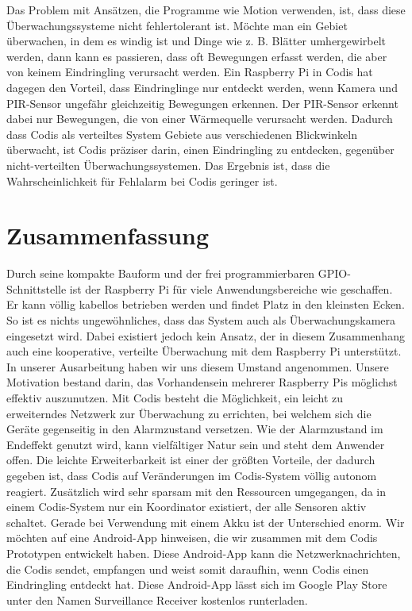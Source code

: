 \documentclass[journal]{IEEEtran}
\begin{document}
Das Problem mit Ansätzen, die Programme wie Motion verwenden, ist, dass diese Überwachungssysteme nicht fehlertolerant ist. Möchte man ein Gebiet überwachen, in dem es windig ist und Dinge wie z. B. Blätter umhergewirbelt werden, dann kann es passieren, dass oft Bewegungen erfasst werden, die aber von keinem Eindringling verursacht werden. Ein Raspberry Pi in Codis hat dagegen den Vorteil, dass Eindringlinge nur entdeckt werden, wenn Kamera und PIR-Sensor ungefähr gleichzeitig Bewegungen erkennen. Der PIR-Sensor erkennt dabei nur Bewegungen, die von einer Wärmequelle verursacht werden.\cite{raspi} Dadurch dass Codis als verteiltes System Gebiete aus verschiedenen Blickwinkeln überwacht, ist Codis präziser darin, einen Eindringling zu entdecken, gegenüber nicht-verteilten Überwachungssystemen. Das Ergebnis ist, dass die Wahrscheinlichkeit für Fehlalarm bei Codis geringer ist.

\section{Zusammenfassung}
Durch seine kompakte Bauform und der frei programmierbaren GPIO-Schnittstelle ist der Raspberry Pi für viele Anwendungsbereiche wie geschaffen. Er kann völlig kabellos betrieben werden und findet Platz in den kleinsten Ecken. So ist es nichts ungewöhnliches, dass das System auch als Überwachungskamera eingesetzt wird. Dabei existiert jedoch kein Ansatz, der in diesem Zusammenhang auch eine kooperative, verteilte Überwachung mit dem Raspberry Pi unterstützt. \\In unserer Ausarbeitung haben wir uns diesem Umstand angenommen. Unsere Motivation bestand darin, das Vorhandensein mehrerer Raspberry Pis möglichst effektiv auszunutzen. Mit Codis besteht die Möglichkeit, ein leicht zu erweiterndes Netzwerk zur Überwachung zu errichten, bei welchem sich die Geräte gegenseitig in den Alarmzustand versetzen. Wie der Alarmzustand im Endeffekt genutzt wird, kann vielfältiger Natur sein und steht dem Anwender offen. Die leichte Erweiterbarkeit ist einer der größten Vorteile, der dadurch gegeben ist, dass Codis auf Veränderungen im Codis-System völlig autonom reagiert. Zusätzlich wird sehr sparsam mit den Ressourcen umgegangen, da in einem Codis-System nur ein Koordinator existiert, der alle Sensoren aktiv schaltet. Gerade bei Verwendung mit einem Akku ist der Unterschied enorm. Wir möchten auf eine Android-App hinweisen, die wir zusammen mit dem Codis Prototypen entwickelt haben. Diese Android-App kann die Netzwerknachrichten, die Codis sendet, empfangen und weist somit daraufhin, wenn Codis einen Eindringling entdeckt hat. Diese Android-App lässt sich im Google Play Store unter den Namen Surveillance Receiver kostenlos runterladen.



\printbibliography
\end{document}
